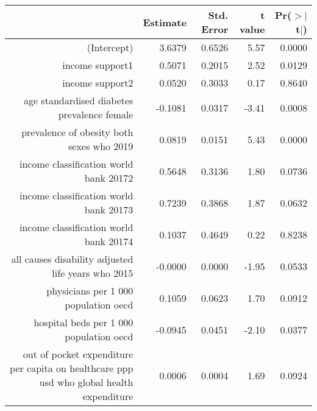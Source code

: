 \begin{table}[ht]
\centering
\begin{tabular}{rrrrr}
  \hline
 & Estimate & Std. Error & t value & Pr($>$$|$t$|$) \\ 
  \hline
(Intercept) & 3.6379 & 0.6526 & 5.57 & 0.0000 \\ 
  income support1 & 0.5071 & 0.2015 & 2.52 & 0.0129 \\ 
  income support2 & 0.0520 & 0.3033 & 0.17 & 0.8640 \\ 
  age standardised diabetes prevalence female & -0.1081 & 0.0317 & -3.41 & 0.0008 \\ 
  prevalence of obesity both sexes who 2019 & 0.0819 & 0.0151 & 5.43 & 0.0000 \\ 
  income classification world bank 20172 & 0.5648 & 0.3136 & 1.80 & 0.0736 \\ 
  income classification world bank 20173 & 0.7239 & 0.3868 & 1.87 & 0.0632 \\ 
  income classification world bank 20174 & 0.1037 & 0.4649 & 0.22 & 0.8238 \\ 
  all causes disability adjusted life years who 2015 & -0.0000 & 0.0000 & -1.95 & 0.0533 \\ 
  physicians per 1 000 population oecd & 0.1059 & 0.0623 & 1.70 & 0.0912 \\ 
  hospital beds per 1 000 population oecd & -0.0945 & 0.0451 & -2.10 & 0.0377 \\ 
  out of pocket expenditure per capita on healthcare ppp usd who global health expenditure & 0.0006 & 0.0004 & 1.69 & 0.0924 \\ 
   \hline
\end{tabular}
\end{table}
